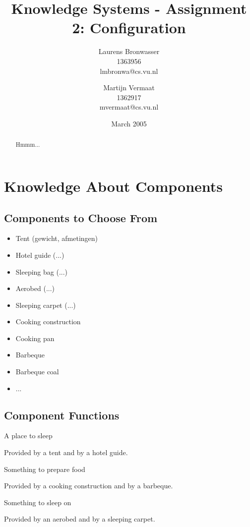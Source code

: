 \documentclass[a4paper,11pt]{article}
\title{Knowledge Systems - Assignment 2: Configuration}
\author{Laurens Bronwasser\\
1363956\\
lmbronwa@cs.vu.nl
\and
Martijn Vermaat\\
1362917\\
mvermaat@cs.vu.nl}
\date{March 2005}
\begin{document}
\maketitle


\renewcommand{\abstractname}{Introduction} %
\begin{abstract}
  Hmmm...
\end{abstract}


\section*{Knowledge About Components}


\subsection*{Components to Choose From}

\begin{itemize}
\item Tent (gewicht, afmetingen)
\item Hotel guide (...)
\item Sleeping bag (...)
\item Aerobed (...)
\item Sleeping carpet (...)
\item Cooking construction
\item Cooking pan
\item Barbeque
\item Barbeque coal
\item ...
\end{itemize}


\subsection*{Component Functions}

\begin{description}

\item{A place to sleep}

Provided by a tent and by a hotel guide.

\item{Something to prepare food}

Provided by a cooking construction and by a barbeque.

\item{Something to sleep on}

Provided by an aerobed and by a sleeping carpet.

\end{description}
\end{document}
